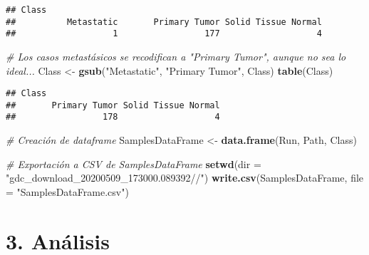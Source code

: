 \documentclass[
]{article}
\newenvironment{Shaded}{\begin{snugshade}}{\end{snugshade}}
\newcommand{\CommentTok}[1]{\textcolor[rgb]{0.56,0.35,0.01}{\textit{#1}}}
\newcommand{\DataTypeTok}[1]{\textcolor[rgb]{0.13,0.29,0.53}{#1}}
\newcommand{\KeywordTok}[1]{\textcolor[rgb]{0.13,0.29,0.53}{\textbf{#1}}}
\newcommand{\NormalTok}[1]{#1}
\newcommand{\OperatorTok}[1]{\textcolor[rgb]{0.81,0.36,0.00}{\textbf{#1}}}
\newcommand{\StringTok}[1]{\textcolor[rgb]{0.31,0.60,0.02}{#1}}
\begin{document}
\begin{Shaded}
\end{Shaded}

\begin{verbatim}
## Class
##          Metastatic       Primary Tumor Solid Tissue Normal 
##                   1                 177                   4
\end{verbatim}

\begin{Shaded}
\begin{Highlighting}[]
\CommentTok{# Los casos metastásicos se recodifican a "Primary Tumor", aunque no sea lo ideal...}
\NormalTok{Class <-}\StringTok{ }\KeywordTok{gsub}\NormalTok{(}\StringTok{"Metastatic"}\NormalTok{, }\StringTok{"Primary Tumor"}\NormalTok{, Class)}
\KeywordTok{table}\NormalTok{(Class)}
\end{Highlighting}
\end{Shaded}

\begin{verbatim}
## Class
##       Primary Tumor Solid Tissue Normal 
##                 178                   4
\end{verbatim}

\begin{Shaded}
\begin{Highlighting}[]
\CommentTok{# Creación de dataframe}
\NormalTok{SamplesDataFrame <-}\StringTok{ }\KeywordTok{data.frame}\NormalTok{(Run, Path, Class)}

\CommentTok{# Exportación a CSV de SamplesDataFrame}
\KeywordTok{setwd}\NormalTok{(}\DataTypeTok{dir =} \StringTok{"gdc_download_20200509_173000.089392//"}\NormalTok{)}
\KeywordTok{write.csv}\NormalTok{(SamplesDataFrame, }\DataTypeTok{file =} \StringTok{"SamplesDataFrame.csv"}\NormalTok{)}
\end{Highlighting}
\end{Shaded}

\hypertarget{anuxe1lisis}{%
\section{3. Análisis}\label{anuxe1lisis}}
\end{document}
